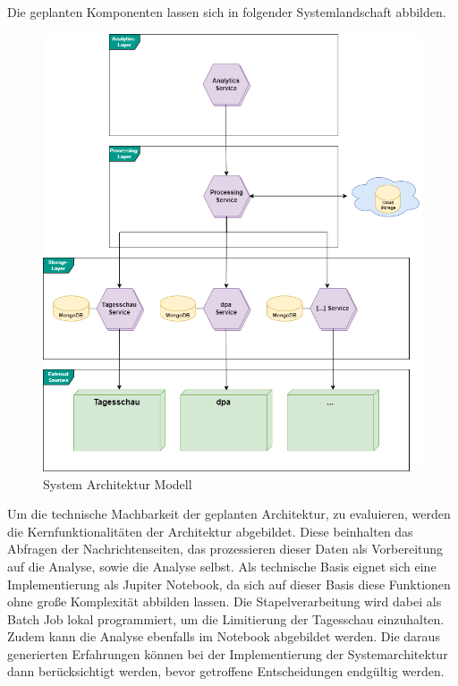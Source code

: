 Die geplanten Komponenten lassen sich in folgender Systemlandschaft abbilden.

\begin{figure}
    \centering
    \includegraphics[width=0.5\linewidth]{abbildungen/System Architektur.drawio.png}
    \caption{System Architektur Modell}
    \label{fig:system-architecture}
\end{figure}
\newpage
Um die technische Machbarkeit der geplanten Architektur, zu evaluieren, werden die Kernfunktionalitäten der Architektur abgebildet. Diese beinhalten das Abfragen der Nachrichtenseiten, das prozessieren dieser Daten als Vorbereitung auf die Analyse, sowie die Analyse selbst. 
Als technische Basis eignet sich eine Implementierung als Jupiter Notebook, da sich auf dieser Basis diese Funktionen ohne große Komplexität abbilden lassen. 
Die Stapelverarbeitung wird dabei als Batch Job lokal programmiert, um die Limitierung der Tagesschau einzuhalten. Zudem kann die Analyse ebenfalls im Notebook abgebildet werden. 
Die daraus generierten Erfahrungen können bei der Implementierung der Systemarchitektur dann berücksichtigt werden, bevor getroffene Entscheidungen endgültig werden.

